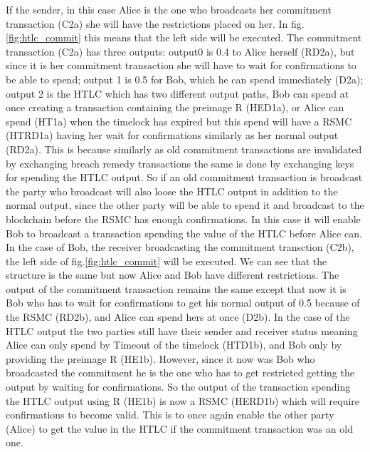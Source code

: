 If the sender, in this case Alice is the one who broadcasts her commitment transaction (C2a) she will have the restrictions placed on her.
In fig.\ref{fig:htlc_commit} this means that the left side will be executed. The commitment transaction (C2a) has three outputs: output0 is 0.4 to Alice herself (RD2a), but since it is her commitment transaction she will have to wait for confirmations to be able to spend; output 1 is 0.5 for Bob, which he can spend immediately (D2a); output 2 is the HTLC which has two different output paths, Bob can spend at once creating a transaction containing the preimage R (HED1a), or Alice can spend (HT1a) when the timelock has expired but this spend will have a RSMC (HTRD1a) having her wait for confirmations similarly as her normal output (RD2a). This is because similarly as old commitment transactions are invalidated by exchanging breach remedy transactions the same is done by exchanging keys for spending the HTLC output. So if an old commitment transaction is broadcast the party who broadcast will also loose the HTLC output in addition to the normal output, since the other party will be able to spend it and broadcast to the blockchain before the RSMC has enough confirmations. In this case it will enable Bob to broadcast a transaction spending the value of the HTLC before Alice can.
In the case of Bob, the receiver broadcasting the commitment transction (C2b), the left side of fig.\ref{fig:htlc_commit} will be executed. We can see that the structure is the same but now Alice and Bob have different restrictions. The output of the commitment transaction remains the same except that now it is Bob who has to wait for confirmations to get his normal output of 0.5 because of the RSMC (RD2b), and Alice can spend hers at once (D2b). In the case of the HTLC output the two parties still have their sender and receiver status meaning Alice can only spend by Timeout of the timelock (HTD1b), and Bob only by providing the preimage R (HE1b). However, since it now was Bob who broadcasted the commitment he is the one who has to get restricted getting the output by waiting for confirmations. So the output of the transaction spending the HTLC output using R (HE1b) is now a RSMC (HERD1b) which will require confirmations to become valid. This is to once again enable the other party (Alice) to get the value in the HTLC if the commitment transaction was an old one.  
\\ 

